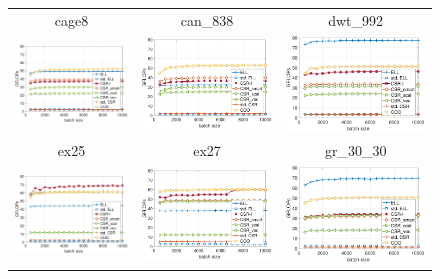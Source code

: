 \begin{figure}[thb!]
\begin{center}
\begin{tabular}{ccc}
\hline
{\sc cage8} & {\sc can\_838} & {\sc dwt\_992}\\
\includegraphics[width=.30\columnwidth]{plots/single_matrices/GFLOPS/cage8_GFLOPs}
&
\includegraphics[width=.30\columnwidth]{plots/single_matrices/GFLOPS/can_838_GFLOPs}
&
\includegraphics[width=.30\columnwidth]{plots/single_matrices/GFLOPS/dwt_992_GFLOPs}
\\
\hline
{\sc ex25} & {\sc ex27} & {\sc gr\_30\_30}\\
\includegraphics[width=.30\columnwidth]{plots/single_matrices/GFLOPS/ex2_GFLOPs}
&
\includegraphics[width=.30\columnwidth]{plots/single_matrices/GFLOPS/ex27_GFLOPs}
&
\includegraphics[width=.30\columnwidth]{plots/single_matrices/GFLOPS/gr_30_30_GFLOPs}

\end{tabular}
\end{center}
\end{figure}
